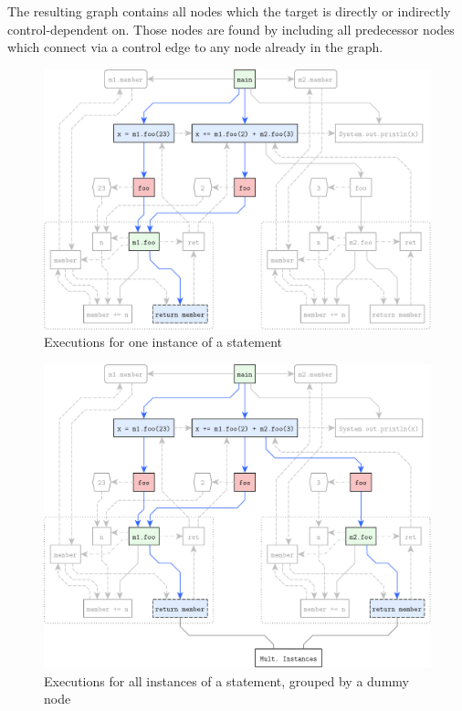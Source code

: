 The resulting graph contains all nodes which the target is directly or indirectly control-dependent on. Those nodes are 
found by including all predecessor nodes which connect via a control edge to any node already in the graph.

\begin{figure}[p]
  \centering
    \includegraphics[scale=0.6]{sdgs/executions_one}
  \caption{Executions for one instance of a statement}
  \label{fig:sdg-executions_one}
\end{figure}

\begin{figure}[p]
  \centering
    \includegraphics[scale=0.6]{sdgs/executions_all}
  \caption{Executions for all instances of a statement, grouped by a dummy node}
  \label{fig:sdg-executions_all}
\end{figure}


